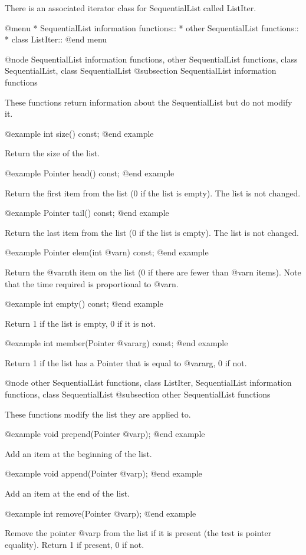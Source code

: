 There is an associated iterator class for SequentialList called ListIter.

@menu
* SequentialList information functions::
* other SequentialList functions::
* class ListIter::
@end menu

@node SequentialList information functions, other SequentialList functions, class SequentialList, class SequentialList
@subsection SequentialList information functions

These functions return information about the SequentialList but do not
modify it.

@example
int size() const;
@end example

Return the size of the list.

@example
Pointer head() const;
@end example

Return the first item from the list (0 if the list is empty).  The
list is not changed.

@example
Pointer tail() const;
@end example

Return the last item from the list (0 if the list is empty).  The
list is not changed.

@example
Pointer elem(int @var{n}) const;
@end example

Return the @var{n}th item on the list (0 if there are fewer than @var{n} items).
Note that the time required is proportional to @var{n}.

@example
int empty() const;
@end example

Return 1 if the list is empty, 0 if it is not.

@example
int member(Pointer @var{arg}) const;
@end example

Return 1 if the list has a Pointer that is equal to @var{arg}, 0 if not.

@node other SequentialList functions, class ListIter, SequentialList information functions, class SequentialList
@subsection other SequentialList functions

These functions modify the list they are applied to.

@example
void prepend(Pointer @var{p});
@end example

Add an item at the beginning of the list.

@example
void append(Pointer @var{p});
@end example

Add an item at the end of the list.

@example
int remove(Pointer @var{p});
@end example

Remove the pointer @var{p} from the list if it is present (the test is pointer
equality).  Return 1 if present, 0 if not.

